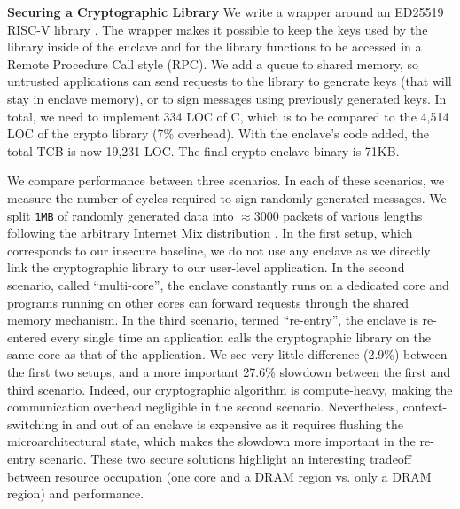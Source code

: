 \noindent\textbf{Securing a Cryptographic Library}
\label{sec:evalcrypto}
We write a wrapper around an ED25519 RISC-V library \cite{ed25519github}.
The wrapper makes it possible to keep the keys used by the library inside of the enclave and for the library functions to be accessed in a Remote Procedure Call style (RPC).
We add a queue to shared memory, so untrusted applications can send requests to the library to generate keys (that will stay in enclave memory), or to sign messages using previously generated keys.
In total, we need to implement 334 LOC of C, which is to be compared to the 4,514 LOC of the crypto library (7\% overhead).
With the enclave's code added, the total TCB is now 19,231 LOC.
The final crypto-enclave binary is 71KB.

We compare performance between three scenarios.
In each of these scenarios, we measure the number of cycles required to sign randomly generated messages.
We split \texttt{1MB} of randomly generated data into $\approx 3000$ packets of various lengths following the arbitrary Internet Mix distribution \cite{imix}.
In the first setup, which corresponds to our insecure baseline, we do not use any enclave as we directly link the cryptographic library to our user-level application.
In the second scenario, called ``multi-core'', the enclave constantly runs on a dedicated core and programs running on other cores can forward requests through the shared memory mechanism.
In the third scenario, termed ``re-entry'', the enclave is re-entered every single time an application calls the cryptographic library on the same core as that of the application.
We see very little difference (2.9\%) between the first two setups, and a more important 27.6\% slowdown between the first and third scenario.
Indeed, our cryptographic algorithm is compute-heavy, making the communication overhead negligible in the second scenario.
Nevertheless, context-switching in and out of an enclave is expensive as it requires flushing the microarchitectural state, which makes the slowdown more important in the re-entry scenario.
These two secure solutions highlight an interesting tradeoff between resource occupation (one core and a DRAM region vs. only a DRAM region) and performance.

